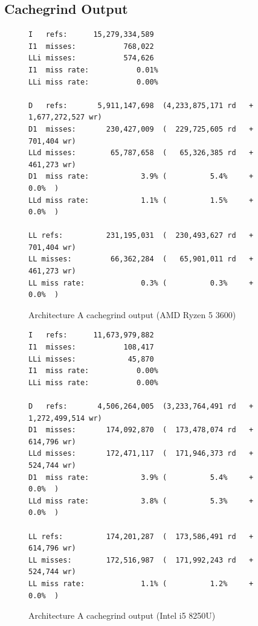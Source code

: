 \documentclass{article}
\begin{document}
\subsection{Cachegrind Output}
\begin{figure}[!h]
\centering
\begin{BVerbatim}
I   refs:      15,279,334,589
I1  misses:           768,022
LLi misses:           574,626
I1  miss rate:           0.01%
LLi miss rate:           0.00%

D   refs:       5,911,147,698  (4,233,875,171 rd   + 1,677,272,527 wr)
D1  misses:       230,427,009  (  229,725,605 rd   +       701,404 wr)
LLd misses:        65,787,658  (   65,326,385 rd   +       461,273 wr)
D1  miss rate:            3.9% (          5.4%     +           0.0%  )
LLd miss rate:            1.1% (          1.5%     +           0.0%  )

LL refs:          231,195,031  (  230,493,627 rd   +       701,404 wr)
LL misses:         66,362,284  (   65,901,011 rd   +       461,273 wr)
LL miss rate:             0.3% (          0.3%     +           0.0%  )
\end{BVerbatim}
\caption{Architecture A cachegrind output (AMD Ryzen 5 3600)}
\label{arch_a_cachegrind_pc}
\end{figure}

\begin{figure}[!h]
\centering
\begin{BVerbatim}
I   refs:      11,673,979,882
I1  misses:           108,417
LLi misses:            45,870
I1  miss rate:           0.00%
LLi miss rate:           0.00%

D   refs:       4,506,264,005  (3,233,764,491 rd   + 1,272,499,514 wr)
D1  misses:       174,092,870  (  173,478,074 rd   +       614,796 wr)
LLd misses:       172,471,117  (  171,946,373 rd   +       524,744 wr)
D1  miss rate:            3.9% (          5.4%     +           0.0%  )
LLd miss rate:            3.8% (          5.3%     +           0.0%  )

LL refs:          174,201,287  (  173,586,491 rd   +       614,796 wr)
LL misses:        172,516,987  (  171,992,243 rd   +       524,744 wr)
LL miss rate:             1.1% (          1.2%     +           0.0%  )
\end{BVerbatim}
\caption{Architecture A cachegrind output (Intel i5 8250U)}
\label{arch_a_cachegrind_laptop}
\end{figure}
\end{document}

